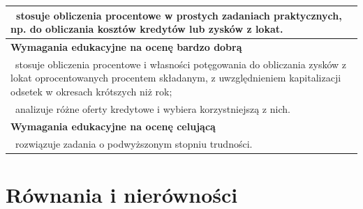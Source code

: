 \documentclass[12pt,a4paper]{article}
\begin{document}
\begin{longtable}{|p{16cm}|}
		\textbullet\ stosuje obliczenia procentowe w prostych zadaniach praktycznych, np. do obliczania kosztów kredytów lub zysków z lokat. \\ \hline
		
		\textbf{Wymagania edukacyjne na ocenę bardzo dobrą} \\ \hline
		
		\textbullet\ stosuje obliczenia procentowe i własności potęgowania do obliczania zysków z lokat oprocentowanych procentem składanym, z uwzględnieniem kapitalizacji odsetek w okresach krótszych niż rok; \\
		
		\textbullet\ analizuje różne oferty kredytowe i wybiera korzystniejszą z nich. \\ \hline
		
		\textbf{Wymagania edukacyjne na ocenę celującą} \\ \hline
		
		\textbullet\ rozwiązuje zadania o podwyższonym stopniu trudności. \\ \hline
		
	\end{longtable}
	
	\section{Równania i nierówności}
	
\end{document}
